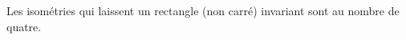 Les isométries qui laissent un rectangle (non carré) invariant sont au nombre de quatre.

\begin{reponses}
\end{reponses}

